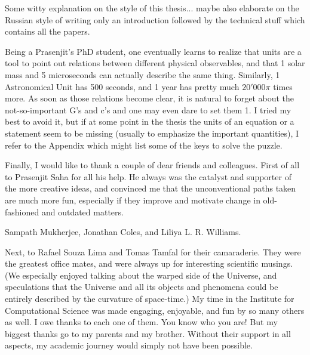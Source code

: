 Some witty explanation on the style of this thesis...  maybe also elaborate on
the Russian style of writing only an introduction followed by the technical
stuff which contains all the papers.   

Being a Prasenjit's PhD student, one eventually learns to realize that units are
a tool to point out relations between different physical observables, and that 1
solar mass and 5 microseconds can actually describe the same thing.  Similarly,
1 Astronomical Unit has 500 seconds, and 1 year has pretty much $20'000\pi$
times more.  As soon as those relations become clear, it is natural to forget
about the not-so-important G's and c's and one may even dare to set them 1.  I
tried my best to avoid it, but if at some point in the thesis the units of an
equation or a statement seem to be missing (usually to emphasize the important
quantities), I refer to the Appendix which might list some of the keys to solve
the puzzle.

Finally, I would like to thank a couple of dear friends and colleagues.  First
of all to Prasenjit Saha for all his help.  He always was the catalyst and
supporter of the more creative ideas, and convinced me that the unconventional
paths taken are much more fun, especially if they improve and motivate change in
old-fashioned and outdated matters.  

Sampath Mukherjee, Jonathan Coles, and Liliya L. R. Williams.

Next, to Rafael Souza Lima and Tomas Tamfal
for their camaraderie.  They were the greatest office mates, and were always up
for interesting scientific musings.  (We especially enjoyed talking about the
warped side of the Universe, and speculations that the Universe and all its
objects and phenomena could be entirely described by the curvature of
space-time.)  My time in the Institute for Computational Science was made
engaging, enjoyable, and fun by so many others as well. I owe thanks to each one
of them.  You know who you are!  But my biggest thanks go to my parents and my
brother. Without their support in all aspects, my academic journey would simply
not have been possible.